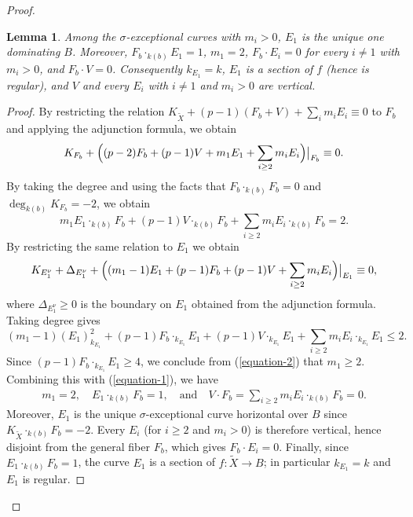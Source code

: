 \documentclass[reqno,oneside]{amsart}
\newtheorem{lemma}[theorem]{Lemma}
\theoremstyle{definition}
\theoremstyle{plain}
\numberwithin{equation}{section}
\begin{document}
\begin{proof}
\begin{lemma}\label{lemma-on-E1}
  Among the $\sigma$-exceptional curves with $m_i>0$, $E_1$ is the unique one dominating $B$.
  Moreover, $F_b\cdot_{k(b)}E_1=1$, $m_1=2$, $F_b\cdot E_i=0$ for every $i\ne1$ with $m_i>0$, and $F_b\cdot V=0$.
  Consequently $k_{E_1}=k$, $E_1$ is a section of $f$ (hence is regular), and $V$ and every $E_i$ with $i\ne1$ and $m_i>0$ are vertical.
\end{lemma}
\begin{proof}
  By restricting the relation $K_{\widetilde{X}} + (p-1) (F_b + V) + \sum_i m_i E_i \equiv 0$ to $F_b$ and applying the adjunction formula, we obtain
  \[
     K_{F_b} + \Bigl((p-2)F_b+(p-1) V + m_1E_1+ \sum_{i\geq 2} m_i E_i\Bigr)\big|_{F_b}\equiv 0.
  \]
  By taking the degree and using the facts that $F_b\cdot_{k(b)} F_b = 0$ and $\deg_{k(b)} K_{F_b}=-2$, we obtain
  \begin{equation}\label{equation-1}
    m_1E_1 \cdot_{k(b)} F_b + (p-1)V\cdot_{k(b)} F_b + \sum_{i\geq 2} m_i E_i\cdot_{k(b)} F_b = 2 .
  \end{equation}
  By restricting the same relation to $E_1$ we obtain
  \[
     K_{E_1^{\nu}} + \Delta_{E_1^{\nu}} + \Bigl((m_1-1)E_1+ (p-1)F_b+(p-1) V + \sum_{i\geq 2} m_i E_i\Bigr)\big|_{E_1}\equiv 0,
  \]
  where $\Delta_{E_1^\nu}\ge0$ is the boundary on $E_1$ obtained from the adjunction formula.
  Taking degree gives
  \begin{equation}\label{equation-2}
        (m_1-1)(E_1)^2_{k_{E_1}} + (p-1)F_b\cdot_{k_{E_1}} E_1 +
        (p-1) V\cdot_{k_{E_1}} E_1 + \sum_{i\geq 2} m_i E_i \cdot_{k_{E_1}} E_1 \le 2.
  \end{equation}
  Since $(p-1)F_b\cdot_{k_{E_1}} E_1 \geq 4$, we conclude from (\ref{equation-2}) that $m_1 \geq 2$.
  Combining this with (\ref{equation-1}), we have
  \begin{align}\label{equation-3}
    m_1 =2, \quad
    E_1 \cdot_{k(b)} F_b=1, \quad\text{and}\quad
    V\cdot F_b = \sum_{i\geq 2} m_i E_i\cdot_{k(b)} F_b=0.
  \end{align}
  Moreover, $E_1$ is the unique $\sigma$-exceptional curve horizontal over $B$ since $K_{\widetilde X} \cdot_{k(b)} F_b = -2$.
  Every $E_i$ (for $i\ge2$ and $m_i>0$) is therefore vertical, hence disjoint from the general fiber $F_b$, which gives $F_b\cdot E_i=0$. 
  Finally, since $E_1 \cdot_{k(b)} F_b=1$, the curve $E_1$ is a section of $f\colon\widetilde{X} \to B$; in particular $k_{E_1}=k$ and $E_1$ is regular.
\end{proof}


\end{proof}
\end{document}
